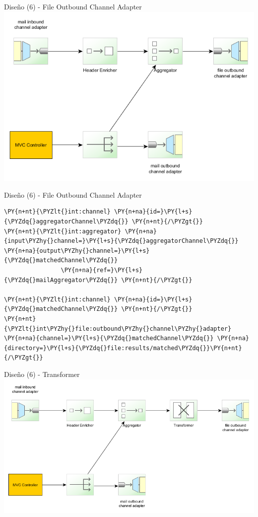 \documentclass{beamer}
\begin{document}
\begin{frame}{Diseño (6) - File Outbound Channel Adapter}
\includegraphics[width=0.9\linewidth]{sp-int-10b}
\end{frame}

\begin{frame}[fragile]{Diseño (6) - File Outbound Channel Adapter}
\begin{Verbatim}[fontsize=\tiny,commandchars=\\\{\}]
\PY{n+nt}{\PYZlt{}int:channel} \PY{n+na}{id=}\PY{l+s}{\PYZdq{}aggregatorChannel\PYZdq{}} \PY{n+nt}{/\PYZgt{}}
\PY{n+nt}{\PYZlt{}int:aggregator} \PY{n+na}{input\PYZhy{}channel=}\PY{l+s}{\PYZdq{}aggregatorChannel\PYZdq{}} \PY{n+na}{output\PYZhy{}channel=}\PY{l+s}{\PYZdq{}matchedChannel\PYZdq{}} 
                \PY{n+na}{ref=}\PY{l+s}{\PYZdq{}mailAggregator\PYZdq{}} \PY{n+nt}{/\PYZgt{}}

\PY{n+nt}{\PYZlt{}int:channel} \PY{n+na}{id=}\PY{l+s}{\PYZdq{}matchedChannel\PYZdq{}} \PY{n+nt}{/\PYZgt{}}
\PY{n+nt}{\PYZlt{}int\PYZhy{}file:outbound\PYZhy{}channel\PYZhy{}adapter} \PY{n+na}{channel=}\PY{l+s}{\PYZdq{}matchedChannel\PYZdq{}} \PY{n+na}{directory=}\PY{l+s}{\PYZdq{}file:results/matched\PYZdq{}}\PY{n+nt}{/\PYZgt{}}
\end{Verbatim}
\end{frame}

\begin{frame}{Diseño (6) - Transformer}
\includegraphics[width=1.0\linewidth]{sp-int-11b}
\end{frame}
\end{document}
